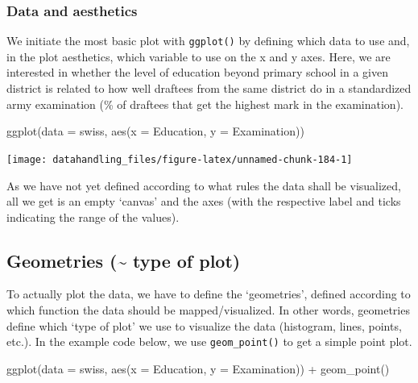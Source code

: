 \documentclass[
  12pt,
]{style/krantz}
\newenvironment{Shaded}{\begin{snugshade}}{\end{snugshade}}
\newcommand{\AttributeTok}[1]{\textcolor[rgb]{0.77,0.63,0.00}{#1}}
\newcommand{\FunctionTok}[1]{\textcolor[rgb]{0.00,0.00,0.00}{#1}}
\newcommand{\NormalTok}[1]{#1}
\newcommand{\SpecialCharTok}[1]{\textcolor[rgb]{0.00,0.00,0.00}{#1}}
\begin{document}
\hypertarget{data-and-aesthetics}{%
\subsubsection{Data and aesthetics}\label{data-and-aesthetics}}

We initiate the most basic plot with \texttt{ggplot()} by defining which data to use and, in the plot aesthetics, which variable to use on the x and y axes. Here, we are interested in whether the level of education beyond primary school in a given district is related to how well draftees from the same district do in a standardized army examination (\% of draftees that get the highest mark in the examination).

\begin{Shaded}
\begin{Highlighting}[]
\FunctionTok{ggplot}\NormalTok{(}\AttributeTok{data =}\NormalTok{ swiss, }\FunctionTok{aes}\NormalTok{(}\AttributeTok{x =}\NormalTok{ Education, }\AttributeTok{y =}\NormalTok{ Examination))}
\end{Highlighting}
\end{Shaded}

\texttt{[image: datahandling\_files/figure-latex/unnamed-chunk-184-1]}

As we have not yet defined according to what rules the data shall be visualized, all we get is an empty `canvas' and the axes (with the respective label and ticks indicating the range of the values).

\hypertarget{geometries-type-of-plot}{%
\subsection{Geometries (\textasciitilde{} type of plot)}\label{geometries-type-of-plot}}

To actually plot the data, we have to define the `geometries', defined according to which function the data should be mapped/visualized. In other words, geometries define which `type of plot' we use to visualize the data (histogram, lines, points, etc.). In the example code below, we use \texttt{geom\_point()} to get a simple point plot.

\begin{Shaded}
\begin{Highlighting}[]
\FunctionTok{ggplot}\NormalTok{(}\AttributeTok{data =}\NormalTok{ swiss, }\FunctionTok{aes}\NormalTok{(}\AttributeTok{x =}\NormalTok{ Education, }\AttributeTok{y =}\NormalTok{ Examination)) }\SpecialCharTok{+}
     \FunctionTok{geom\_point}\NormalTok{()}
\end{Highlighting}
\end{Shaded}
\end{document}
